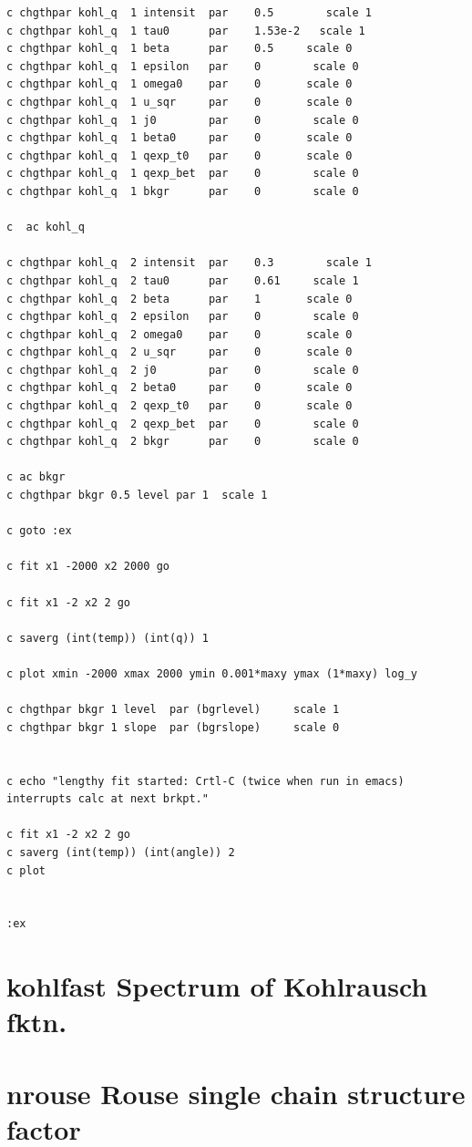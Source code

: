 \documentclass[11pt,fleqn]{book} %
\newcommand{\desc}[1]{\hskip 0.5cm {\color{descgray} #1}}
\begin{document}
\begin{verbatim}
c chgthpar kohl_q  1 intensit  par    0.5        scale 1      
c chgthpar kohl_q  1 tau0      par    1.53e-2   scale 1
c chgthpar kohl_q  1 beta      par    0.5 	  scale 0
c chgthpar kohl_q  1 epsilon   par    0        scale 0
c chgthpar kohl_q  1 omega0    par    0 	  scale 0
c chgthpar kohl_q  1 u_sqr     par    0 	  scale 0
c chgthpar kohl_q  1 j0        par    0        scale 0
c chgthpar kohl_q  1 beta0     par    0 	  scale 0
c chgthpar kohl_q  1 qexp_t0   par    0 	  scale 0
c chgthpar kohl_q  1 qexp_bet  par    0        scale 0
c chgthpar kohl_q  1 bkgr      par    0        scale 0

c  ac kohl_q

c chgthpar kohl_q  2 intensit  par    0.3        scale 1      
c chgthpar kohl_q  2 tau0      par    0.61     scale 1
c chgthpar kohl_q  2 beta      par    1 	  scale 0
c chgthpar kohl_q  2 epsilon   par    0        scale 0
c chgthpar kohl_q  2 omega0    par    0 	  scale 0
c chgthpar kohl_q  2 u_sqr     par    0 	  scale 0
c chgthpar kohl_q  2 j0        par    0        scale 0
c chgthpar kohl_q  2 beta0     par    0 	  scale 0
c chgthpar kohl_q  2 qexp_t0   par    0 	  scale 0
c chgthpar kohl_q  2 qexp_bet  par    0        scale 0
c chgthpar kohl_q  2 bkgr      par    0        scale 0

c ac bkgr
c chgthpar bkgr 0.5 level par 1  scale 1

c goto :ex

c fit x1 -2000 x2 2000 go

c fit x1 -2 x2 2 go

c saverg (int(temp)) (int(q)) 1 

c plot xmin -2000 xmax 2000 ymin 0.001*maxy ymax (1*maxy) log_y

c chgthpar bkgr 1 level  par (bgrlevel)     scale 1
c chgthpar bkgr 1 slope  par (bgrslope)     scale 0


c echo "lengthy fit started: Crtl-C (twice when run in emacs) interrupts calc at next brkpt."

c fit x1 -2 x2 2 go
c saverg (int(temp)) (int(angle)) 2 
c plot


:ex
\end{verbatim}

\normalsize
\chapter{kohlfast \desc{Spectrum of Kohlrausch fktn. }}



\chapter{nrouse \desc{Rouse single chain structure factor }}
\end{document}

